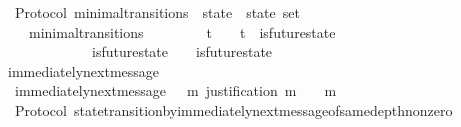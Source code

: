 \begin{isabellebody}
\endisatagproof
{\isafoldproof}%
%
\isadelimproof
\isanewline
%
\endisadelimproof
\isanewline
\isanewline
{}\isamarkupfalse%
\ {\isacharparenleft}\ Protocol{\isacharparenright}\ minimal{\isacharunderscore}transitions\ {\isacharcolon}{\isacharcolon}\ {\isachardoublequoteopen}{\isacharparenleft}state\ {\isacharasterisk}\ state{\isacharparenright}\ set{\isachardoublequoteclose}\isanewline
\ \ \isanewline
\ \ \ \ {\isachardoublequoteopen}minimal{\isacharunderscore}transitions\ {\isasymequiv}\ {\isacharbraceleft}{\isacharparenleft}{\isasymsigma}{\isacharcomma}\ {\isasymsigma}{\isacharprime}{\isacharparenright}\ {\isacharbar}\ {\isasymsigma}\ {\isasymsigma}{\isacharprime}{\isachardot}\ {\isasymsigma}\ {\isasymin}\ {\isasymSigma}t\ {\isasymand}\ {\isasymsigma}{\isacharprime}\ {\isasymin}\ {\isasymSigma}t\ {\isasymand}\ is{\isacharunderscore}future{\isacharunderscore}state\ {\isacharparenleft}{\isasymsigma}{\isacharcomma}\ {\isasymsigma}{\isacharprime}{\isacharparenright}\ {\isasymand}\ {\isasymsigma}\ {\isasymnoteq}\ {\isasymsigma}{\isacharprime}\isanewline
\ \ \ \ \ \ {\isasymand}\ {\isacharparenleft}{\isasymnexists}\ {\isasymsigma}{\isacharprime}{\isacharprime}{\isachardot}\ {\isasymsigma}{\isacharprime}{\isacharprime}\ {\isasymin}\ {\isasymSigma}\ {\isasymand}\ is{\isacharunderscore}future{\isacharunderscore}state\ {\isacharparenleft}{\isasymsigma}{\isacharcomma}\ {\isasymsigma}{\isacharprime}{\isacharprime}{\isacharparenright}\ {\isasymand}\ is{\isacharunderscore}future{\isacharunderscore}state\ {\isacharparenleft}{\isasymsigma}{\isacharprime}{\isacharprime}{\isacharcomma}\ {\isasymsigma}{\isacharprime}{\isacharparenright}\ {\isasymand}\ {\isasymsigma}\ {\isasymnoteq}\ {\isasymsigma}{\isacharprime}{\isacharprime}\ {\isasymand}\ {\isasymsigma}{\isacharprime}{\isacharprime}\ {\isasymnoteq}\ {\isasymsigma}{\isacharprime}{\isacharparenright}{\isacharbraceright}{\isachardoublequoteclose}\isanewline
\isanewline
\isanewline
{}\isamarkupfalse%
\ immediately{\isacharunderscore}next{\isacharunderscore}message\ \isanewline
\ \ {\isachardoublequoteopen}immediately{\isacharunderscore}next{\isacharunderscore}message\ {\isacharequal}\ {\isacharparenleft}{\isasymlambda}{\isacharparenleft}{\isasymsigma}{\isacharcomma}\ m{\isacharparenright}{\isachardot}\ justification\ m\ {\isasymsubseteq}\ {\isasymsigma}\ {\isasymand}\ m\ {\isasymnotin}\ {\isasymsigma}{\isacharparenright}{\isachardoublequoteclose}\isanewline
\isanewline
{}\isamarkupfalse%
\ {\isacharparenleft}\ Protocol{\isacharparenright}\ state{\isacharunderscore}transition{\isacharunderscore}by{\isacharunderscore}immediately{\isacharunderscore}next{\isacharunderscore}message{\isacharunderscore}of{\isacharunderscore}same{\isacharunderscore}depth{\isacharunderscore}non{\isacharunderscore}zero{\isacharcolon}\ \isanewline

\end{isabellebody}
